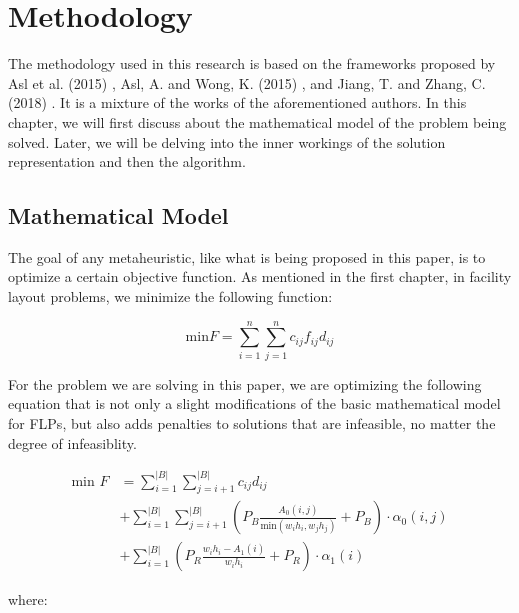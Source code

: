 \chapter{Methodology}
The methodology used in this research is based on the frameworks proposed by Asl et al. (2015) \cite{Asl2015}, Asl, A. and Wong, K. (2015) \cite{Asl2015a}, and Jiang, T. and Zhang, C. (2018) \cite{Jiang2018}. It is a mixture of the works of the aforementioned authors. In this chapter, we will first discuss about the mathematical model of the problem being solved. Later, we will be delving into the inner workings of the solution representation and then the algorithm.

\section{Mathematical Model}
The goal of any metaheuristic, like what is being proposed in this paper, is to optimize a certain objective function. As mentioned in the first chapter, in facility layout problems, we minimize the following function:

$$
\text{min} F = \sum_{i=1}^{n}\sum_{j=1}^{n}c_{ij}f_{ij}d_{ij}
$$

For the problem we are solving in this paper, we are optimizing the following equation that is not only a slight modifications of the basic mathematical model for FLPs, but also adds penalties to solutions that are infeasible, no matter the degree of infeasiblity.

\begin{align*}
	\text{min }F &= \sum_{i=1}^{\left | B \right |}\sum_{j=i + 1}^{\left | B \right |}c_{ij}d_{ij} \\
	& + \sum_{i=1}^{\left | B \right |}\sum_{j=i + 1}^{\left | B \right |} \left ( P_{B}\frac{A_{0}(i, j)}{\text{min}(w_{i}h_{i}, w_{j}h_{j})} + P_{B} \right ) \cdot \alpha_{0}(i, j) \\
	& + \sum_{i=1}^{\left | B \right |}\left( P_{R}\frac{w_{i}h_{i} - A_{1}(i)}{w_{i}h_{i}} + P_{R} \right) \cdot \alpha_{1}(i)
\end{align*}

where:

